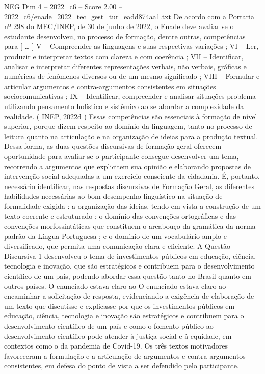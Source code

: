 \begin{textsample}{NEG Dim 4 – 2022\_c6 – Score 2.00 – 2022\_c6/enade\_2022\_tec\_gest\_tur\_eadd874aa1.txt}
De acordo com a Portaria nº 298 do MEC/INEP, de 30 de junho de 2022, o Enade deve avaliar se o estudante desenvolveu, no processo de formação, dentre outras, competências para [ … ] V – Compreender as linguagens e suas respectivas variações ; VI – Ler, produzir e interpretar textos com clareza e com coerência ; VII – Identificar, analisar e interpretar diferentes representações verbais, não verbais, gráficas e numéricas de fenômenos diversos ou de um mesmo significado ; VIII – Formular e articular argumentos e contra-argumentos consistentes em situações sociocomunicativas ; IX – Identificar, compreender e analisar situações-problema utilizando pensamento holístico e sistêmico ao se abordar a complexidade da realidade. ( INEP, 2022d ) Essas competências são essenciais à formação de nível superior, porque dizem respeito ao domínio da linguagem, tanto no processo de leitura quanto na articulação e na organização de ideias para a produção textual.
Dessa forma, as duas questões discursivas de formação geral oferecem oportunidade para avaliar se o participante consegue desenvolver um tema, recorrendo a argumentos que explicitem sua opinião e elaborando propostas de intervenção social adequadas a um exercício consciente da cidadania.
É, portanto, necessário identificar, nas respostas discursivas de Formação Geral, as diferentes habilidades necessárias ao bom desempenho linguístico na situação de formalidade exigida : a organização das ideias, tendo em vista a construção de um texto coerente e estruturado ; o domínio das convenções ortográficas e das convenções morfossintáticas que constituem o arcabouço da gramática da norma-padrão da Língua Portuguesa ; e o domínio de um vocabulário amplo e diversificado, que permita uma comunicação clara e eficiente.
A Questão Discursiva 1 desenvolveu o tema de investimentos públicos em educação, ciência, tecnologia e inovação, que são estratégicos e contribuem para o desenvolvimento científico de um país, podendo abordar essa questão tanto no Brasil quanto em outros países.
O enunciado estava claro ao O enunciado estava claro ao encaminhar a solicitação de resposta, evidenciando a exigência de elaboração de um texto que discutisse e explicasse por que os investimentos públicos em educação, ciência, tecnologia e inovação são estratégicos e contribuem para o desenvolvimento científico de um país e como o fomento público ao desenvolvimento científico pode atender à justiça social e à equidade, em contextos como o da pandemia de Covid-19.
Os três textos motivadores favoreceram a formulação e a articulação de argumentos e contra-argumentos consistentes, em defesa do ponto de vista a ser defendido pelo participante.

\end{textsample}
